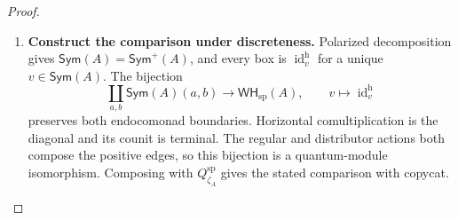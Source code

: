 \documentclass[oneside]{article}
\newcommand{\Sym}{\mathsf{Sym}}
\newcommand{\WH}{\mathsf{WH}}
\newcommand{\id}{\operatorname{id}}
\theoremstyle{plain}
\theoremstyle{definition}
\theoremstyle{remark}
\begin{document}
\begin{proof}
\begin{enumerate}[beginpenalty=10000]
        \item \textbf{Construct the comparison under discreteness.}
        Polarized decomposition gives \(\Sym(A)=\Sym^+(A)\), and every
        box is \(\id_v^{\mathrm h}\) for a unique \(v\in \Sym(A)\). The bijection
        \[
        \coprod_{a,b}\Sym(A)(a,b)\longrightarrow \WH_{\mathrm{sp}}(A),\qquad
        v\longmapsto\id_v^{\mathrm h}
        \]
        preserves both endocomonad boundaries. Horizontal
        comultiplication is the diagonal and its counit is terminal.
        The regular and distributor actions both compose the positive
        edges, so this bijection is a quantum-module isomorphism.
        Composing with \(Q_{\zeta_A}^{\mathrm{sp}}\) gives the stated
        comparison with copycat. \qedhere
    \end{enumerate}
\end{proof}
\end{document}
